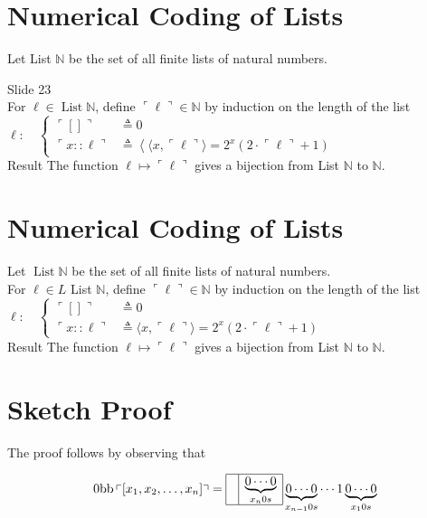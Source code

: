 \documentclass[10pt]{article}
\begin{document}
\section*{Numerical Coding of Lists}
Let List $\mathbb{N}$ be the set of all finite lists of natural numbers.

Slide 23\\
For $\ell \in \operatorname{List} \mathbb{N}$, define $\ulcorner\ell\urcorner \in \mathbb{N}$ by induction on the length of the list\\
$\ell: \quad\left\{\begin{aligned}\ulcorner[]\urcorner & \triangleq 0 \\ \ulcorner x:: \ell\urcorner & \triangleq\left\langle\langle x,\ulcorner\ell\urcorner\rangle=2^{x}(2 \cdot\ulcorner\ell\urcorner+1)\right.\end{aligned}\right.$\\
Result The function $\ell \mapsto\ulcorner\ell\urcorner$ gives a bijection from List $\mathbb{N}$ to $\mathbb{N}$.

\section*{Numerical Coding of Lists}
Let $\operatorname{List} \mathbb{N}$ be the set of all finite lists of natural numbers.\\
For $\ell \in L$ List $\mathbb{N}$, define $\ulcorner\ell\urcorner \in \mathbb{N}$ by induction on the length of the list\\
$\ell: \quad\left\{\begin{aligned}\ulcorner[]\urcorner & \triangleq 0 \\ \ulcorner x:: \ell\urcorner & \triangleq\langle x,\ulcorner\ell\urcorner\rangle=2^{x}(2 \cdot\ulcorner\ell\urcorner+1)\end{aligned}\right.$\\
Result The function $\ell \mapsto\ulcorner\ell\urcorner$ gives a bijection from List $\mathbb{N}$ to $\mathbb{N}$.

\section*{Sketch Proof}
The proof follows by observing that

$$
0 \mathrm{bb}\left\ulcorner\left[x_{1}, x_{2}, \ldots, x_{n}\right]\right\urcorner=\begin{array}{|l|l|}
\hline & \underbrace{0 \cdots 0}_{x_{n} 0 s} \\
\hline
\end{array} \underbrace{0 \cdots 0}_{x_{n-1} 0 s} \cdots 1 \underbrace{0 \cdots 0}_{x_{1} 0 s}
$$
\end{document}
